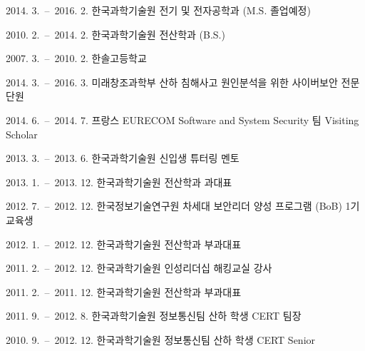\curriculumvitae[korean]
  \begin{personaldata}
    \address  {대전 유성구 구성동 한국과학기술원 N26 (CHiPS 동) 201호}
  \end{personaldata}

  \begin{education}
    \item[2014. 3.\ --\ 2016. 2.] 한국과학기술원 전기 및 전자공학과 (M.S. 졸업예정)
    \item[2010. 2.\ --\ 2014. 2.] 한국과학기술원 전산학과 (B.S.)
    \item[2007. 3.\ --\ 2010. 2.] 한솔고등학교
  \end{education}

  \begin{career}
    \item[2014. 3.\ --\ 2016. 3.] 미래창조과학부 산하 침해사고 원인분석을 위한 사이버보안 전문단원
    \item[2014. 6.\ --\ 2014. 7.] 프랑스 EURECOM Software and System Security 팀 Visiting Scholar
    \item[2013. 3.\ --\ 2013. 6.] 한국과학기술원 신입생 튜터링 멘토
    \item[2013. 1.\ --\ 2013. 12.] 한국과학기술원 전산학과 과대표
    \item[2012. 7.\ --\ 2012. 12.] 한국정보기술연구원 차세대 보안리더 양성 프로그램 (BoB) 1기 교육생
    \item[2012. 1.\ --\ 2012. 12.] 한국과학기술원 전산학과 부과대표
    \item[2011. 2.\ --\ 2012. 12.] 한국과학기술원 인성리더십 해킹교실 강사
    \item[2011. 2.\ --\ 2011. 12.] 한국과학기술원 전산학과 부과대표
    \item[2011. 9.\ --\ 2012. 8.] 한국과학기술원 정보통신팀 산하 학생 CERT 팀장
    \item[2010. 9.\ --\ 2012. 12.] 한국과학기술원 정보통신팀 산하 학생 CERT Senior
  \end{career}

